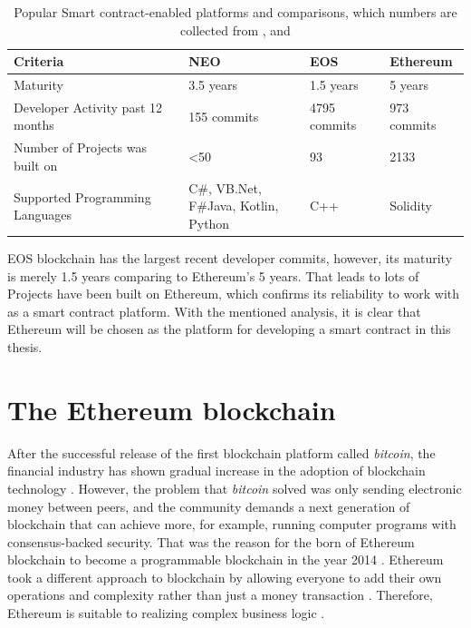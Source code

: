 \documentclass[twoside,numperchapter]{tutthesis} %
\begin{document}
\begin{table}[h]
\begin{tabular}{|l|l|l|l|}
\hline
\textbf{Criteria}                 & \textbf{NEO}                         & \textbf{EOS} & \textbf{Ethereum} \\ \hline
Maturity                          & 3.5 years                            & 1.5 years    & 5 years           \\ \hline
Developer Activity past 12 months & 155 commits                          & 4795 commits & 973 commits       \\ \hline
Number of Projects was built on   & \textless{}50                        & 93           & 2133              \\ \hline
Supported Programming Languages   & \makecell{C\#, VB.Net, \\ F\#Java, Kotlin, Python} & C++        & Solidity          \\ \hline
\end{tabular}
\caption{Popular Smart contract-enabled platforms and comparisons, which numbers are collected from \citep{StateOfDapps}, \citep{CrytoProjectsActivity} and \citep{NEODappsNumber} }
\label{table:popularSmartContractPlatform}
\end{table}

EOS blockchain has the largest recent developer commits, however, its maturity is merely 1.5 years comparing to Ethereum's 5 years. That leads to lots of Projects have been built on Ethereum, which confirms its reliability to work with as a smart contract platform. With the mentioned analysis, it is clear that Ethereum will be chosen as the platform for developing a smart contract in this thesis.

\section{The Ethereum blockchain}

After the successful release of the first blockchain platform called \textit{bitcoin}, the financial industry has shown gradual increase in the adoption of blockchain technology \citep{BlockchainGradualAdoption}. However, the problem that \textit{bitcoin} solved was only sending electronic money between peers, and the community demands a next generation of blockchain that can achieve more, for example, running computer programs with consensus-backed security. That was the reason for the born of Ethereum blockchain to become a programmable blockchain in the year 2014 \citep{Ethdocorg:WhatIsEthereum}. Ethereum took a different approach to blockchain by allowing everyone to add their own operations and complexity rather than just a money transaction \citep{RefWorks:doc:MasteringBlockchain}. Therefore, Ethereum is suitable to realizing complex business logic \citep{RefWorks:doc:EthereumStateOfKnowledge}.
\end{document}

